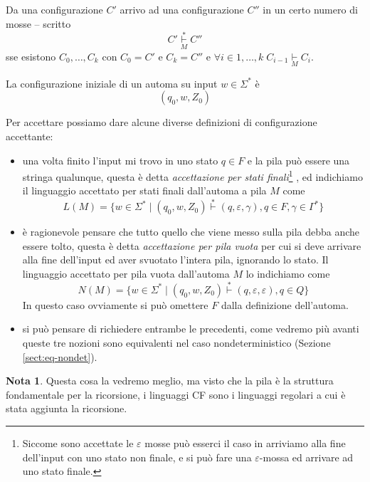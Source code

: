 \documentclass[12pt]{report}
\theoremstyle{definition}
\newtheorem{nota}{Nota}
\begin{document}
Da una configurazione $C'$ arrivo ad una configurazione $C''$ in un certo numero di mosse -- scritto 
$$ C' \underset{M}{\overset{*}{\vdash}} C'' $$
sse esistono $C_0, \dots, C_k$ con $C_0 = C'$ e $C_k = C''$ e $\forall i \in 1, \dots, k \; C_{i - 1} \underset{M}{\vdash} C_i$.

La configurazione iniziale di un automa su input $w \in \Sigma^*$ è 
$$ (q_0, w, Z_0) $$

Per accettare possiamo dare alcune diverse definizioni di configurazione accettante:
\begin{itemize}
	\item una volta finito l'input mi trovo in uno stato $q \in F$ e la pila può essere una stringa qualunque, questa è detta \textit{accettazione per stati finali}\footnote{Siccome sono accettate le $\varepsilon$ mosse può esserci il caso in arriviamo alla fine dell'input con uno stato non finale, e si può fare una $\varepsilon$-mossa ed arrivare ad uno stato finale.}
			, ed indichiamo il linguaggio accettato per stati finali dall'automa a pila $M$ come
		$$ L(M) = \{ w \in \Sigma^* \mid (q_0, w, Z_0) \overset{*}{\vdash} (q, \varepsilon, \gamma), q \in F, \gamma \in \Gamma^* \} $$
	\item è ragionevole pensare che tutto quello che viene messo sulla pila debba anche essere tolto, questa è detta \textit{accettazione per pila vuota} per cui si deve arrivare alla fine dell'input ed aver svuotato l'intera pila, ignorando lo stato.
		Il linguaggio accettato per pila vuota dall'automa $M$ lo indichiamo come
		$$ N(M) = \{ w \in \Sigma^* \mid (q_0, w, Z_0) \overset{*}{\vdash} (q, \varepsilon, \varepsilon), q \in Q \} $$
		In questo caso ovviamente si può omettere $F$ dalla definizione dell'automa.
	\item si può pensare di richiedere entrambe le precedenti, come vedremo più avanti queste tre nozioni sono equivalenti nel caso nondeterministico (Sezione \ref{sect:eq-nondet}).
\end{itemize}
\begin{nota} %
	Questa cosa la vedremo meglio, ma visto che la pila è la struttura fondamentale per la ricorsione, i linguaggi CF sono i linguaggi regolari a cui è stata aggiunta la ricorsione.
\end{nota}
\end{document}
